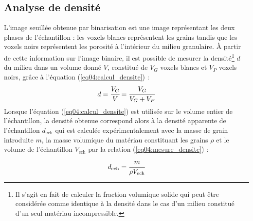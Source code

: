 	\subsection{Analyse de densité}
		L'image seuillée obtenue par binarisation est une image représentant les deux phases de l'échantillon : les voxels blancs représentent les grains tandis que les voxels noirs représentent les porosité à l'intérieur du milieu granulaire. \`A partir de cette information sur l'image binaire, il est possible de mesurer la densité\footnote{Il s'agit en fait de calculer la fraction volumique solide qui peut être considérée comme identique à la densité dans le cas d'un milieu constitué d'un seul matériau incompressible.} $d$ du milieu dans un volume donné $V$, constitué de $V_G$ voxels blancs et $V_P$ voxels noirs, grâce à l'équation (\ref{eq04:calcul_densite}) :
		\begin{equation}\label{eq04:calcul_densite}
			d = \cfrac{V_G}{V} = \cfrac{V_G}{V_G+V_P}
		\end{equation}
		Lorsque l'équation (\ref{eq04:calcul_densite}) est utilisée sur le volume entier de l'échantillon, la densité obtenue correspond alors à la densité apparente de l'échantillon $d_\textrm{ech}$ qui est calculée expérimentalement avec la masse de grain introduite $m$, la masse volumique du matériau constituant les grains $\rho$ et le volume de l'échantillon $V_\textrm{ech}$ par la relation (\ref{eq04:mesure_densite}) :
		\begin{equation}\label{eq04:mesure_densite}
			d_\textrm{ech} = \cfrac{m}{\rho V_\textrm{ech}}
		\end{equation}
